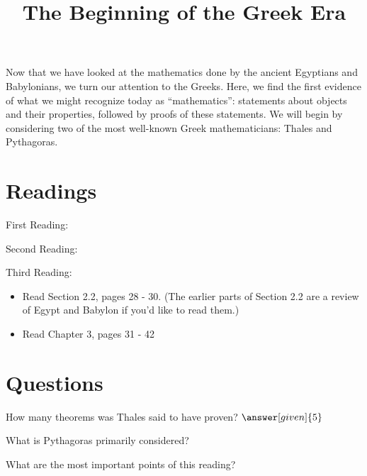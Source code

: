 \documentclass{ximera}
\title{The Beginning of the Greek Era}
\begin{document}
\begin{abstract}
\end{abstract}
\maketitle

Now that we have looked at the mathematics done by the ancient Egyptians and Babylonians, we turn our attention to the Greeks.  Here, we find the first evidence of what we might recognize today as ``mathematics'': statements about objects and their properties, followed by proofs of these statements.  We will begin by considering two of the most well-known Greek mathematicians: Thales and Pythagoras.




\section{Readings}

First Reading: 

Second Reading: 

Third Reading: 
\begin{itemize}
\item Read Section 2.2, pages 28 - 30. (The earlier parts of Section 2.2 are a review of Egypt and Babylon if you'd like to read them.)
\item Read Chapter 3, pages 31 - 42
\end{itemize}



\section{Questions}

\begin{question}
How many theorems was Thales said to have proven? $\answer[given]{5}$
\end{question}


\begin{question}
What is Pythagoras primarily considered?
\begin{multipleChoice}
\end{multipleChoice}
\end{question}






\begin{question}
What are the most important points of this reading?
\begin{freeResponse}
\end{freeResponse}
\end{question}
\end{document}
